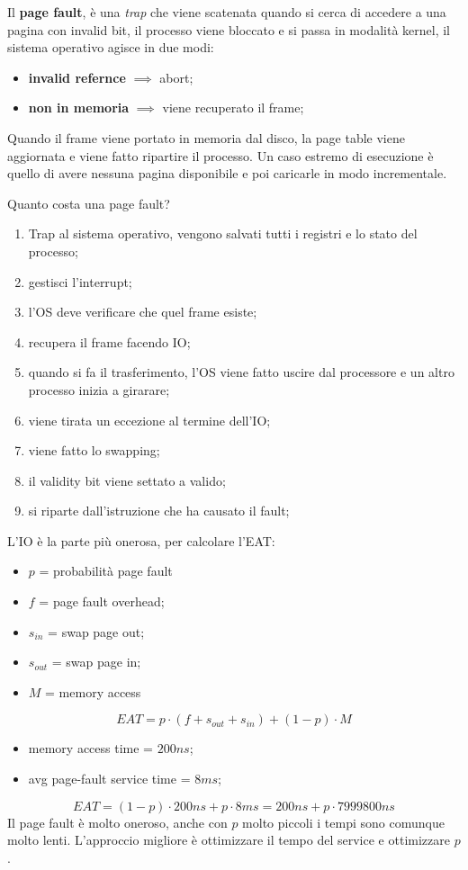 \documentclass[12pt]{article}
\begin{document}
\hfill

Il \textbf{page fault}, \`e una \emph{trap} che viene scatenata quando si cerca di accedere a una pagina con invalid bit, il processo viene bloccato e si passa in modalit\`a kernel, il sistema operativo agisce in due modi:
\begin{itemize}
  \item \textbf{invalid refernce} $ \implies$ abort;
  \item \textbf{non in memoria} $ \implies$ viene recuperato il frame;
\end{itemize}
Quando il frame viene portato in memoria dal disco, la page table viene aggiornata e viene fatto ripartire il processo. Un caso estremo di esecuzione \`e quello di avere nessuna pagina disponibile e poi caricarle in modo incrementale.

Quanto costa una page fault?
\begin{enumerate}
  \item Trap al sistema operativo, vengono salvati tutti i registri e lo stato del processo;
  \item gestisci l'interrupt;
  \item l'OS deve verificare che quel frame esiste;
  \item recupera il frame facendo IO;
  \item quando si fa il trasferimento, l'OS viene fatto uscire dal processore e un altro processo inizia a girarare;
  \item viene tirata un eccezione al termine dell'IO;
  \item viene fatto lo swapping;
  \item il validity bit viene settato a valido;
  \item si riparte dall'istruzione che ha causato il fault;
\end{enumerate}
L'IO \`e la parte pi\`u onerosa, per calcolare l'EAT:
\begin{itemize}
  \item $p$ = probabilit\`a page fault
  \item $f$ = page fault overhead;
  \item $s_{in}$ = swap page out;
  \item $s_{out}$ = swap page in;
  \item $M$ = memory access
\end{itemize}
\[ \boxed{EAT = p \cdot (f + s_{out} + s_{in}) + (1-p) \cdot M} \]
\begin{example}{}{}
  \begin{itemize}
    \item memory access time = $200ns$;
    \item avg page-fault service time = $8ms$;
  \end{itemize}
  \[ EAT = (1-p) \cdot 200ns + p \cdot 8ms = 200ns + p \cdot 7999800ns \]
  Il page fault \`e molto oneroso, anche con $p$ molto piccoli i tempi sono comunque molto lenti. L'approccio migliore \`e ottimizzare il tempo del service e ottimizzare $p$.
\end{example}
\end{document}
